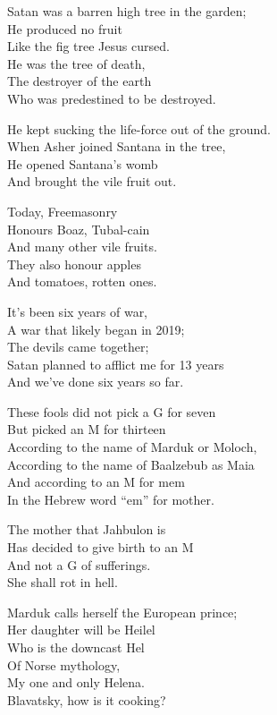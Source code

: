\documentclass[
]{book}
\begin{document}
Satan was a barren high tree in the garden;\\
He produced no fruit\\
Like the fig tree Jesus cursed.\\
He was the tree of death,\\
The destroyer of the earth\\
Who was predestined to be destroyed.

He kept sucking the life-force out of the ground.\\
When Asher joined Santana in the tree,\\
He opened Santana's womb\\
And brought the vile fruit out.

Today, Freemasonry\\
Honours Boaz, Tubal-cain\\
And many other vile fruits.\\
They also honour apples\\
And tomatoes, rotten ones.

It's been six years of war,\\
A war that likely began in 2019;\\
The devils came together;\\
Satan planned to afflict me for 13 years\\
And we've done six years so far.

These fools did not pick a G for seven\\
But picked an M for thirteen\\
According to the name of Marduk or Moloch,\\
According to the name of Baalzebub as Maia\\
And according to an M for mem\\
In the Hebrew word ``em'' for mother.

The mother that Jahbulon is\\
Has decided to give birth to an M\\
And not a G of sufferings.\\
She shall rot in hell.

Marduk calls herself the European prince;\\
Her daughter will be Heilel\\
Who is the downcast Hel\\
Of Norse mythology,\\
My one and only Helena.\\
Blavatsky, how is it cooking?
\end{document}
